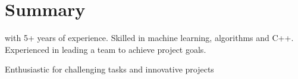 \section{Summary}
\summaryPosition\space with 5+ years of experience. Skilled in machine learning, algorithms and C++. Experienced in leading a team to achieve project goals.

Enthusiastic for challenging tasks and innovative projects %
